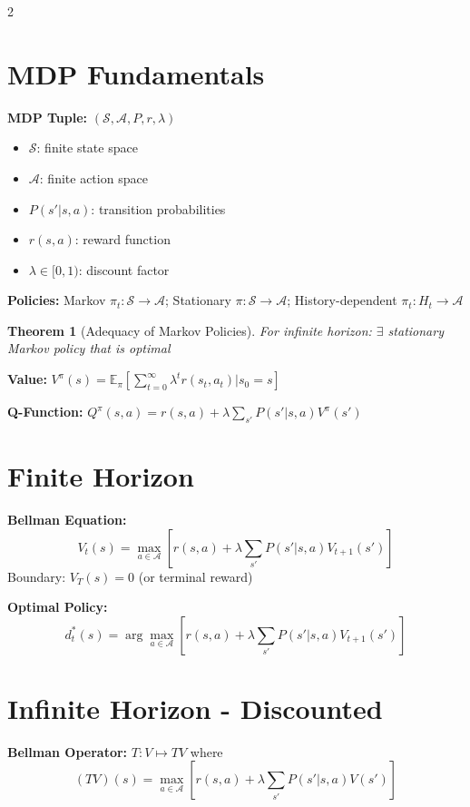 \documentclass[8pt]{extarticle}
\newtheorem{theorem}{Theorem}
\begin{document}
\tiny
\begin{multicols}{2}

\section*{\textcolor{theoremblue}{MDP Fundamentals}}
\textbf{MDP Tuple:} $(\mathcal{S}, \mathcal{A}, P, r, \lambda)$
\begin{itemize}[leftmargin=*]
    \item $\mathcal{S}$: finite state space
    \item $\mathcal{A}$: finite action space  
    \item $P(s'|s,a)$: transition probabilities
    \item $r(s,a)$: reward function
    \item $\lambda \in [0,1)$: discount factor
\end{itemize}

\textbf{Policies:} Markov $\pi_t: \mathcal{S} \to \mathcal{A}$; Stationary $\pi: \mathcal{S} \to \mathcal{A}$; History-dependent $\pi_t: H_t \to \mathcal{A}$

\begin{theorem}[Adequacy of Markov Policies]
For infinite horizon: $\exists$ stationary Markov policy that is optimal
\end{theorem}

\textbf{Value:} $V^\pi(s) = \mathbb{E}_\pi[\sum_{t=0}^\infty \lambda^t r(s_t, a_t) | s_0 = s]$

\textbf{Q-Function:} $Q^\pi(s,a) = r(s,a) + \lambda \sum_{s'} P(s'|s,a) V^\pi(s')$

\section*{\textcolor{theoremblue}{Finite Horizon}}
\textbf{Bellman Equation:}
$$V_t(s) = \max_{a \in \mathcal{A}} \left[r(s,a) + \lambda \sum_{s'} P(s'|s,a) V_{t+1}(s')\right]$$
Boundary: $V_T(s) = 0$ (or terminal reward)

\textbf{Optimal Policy:}
$$d_t^*(s) = \arg\max_{a \in \mathcal{A}} \left[r(s,a) + \lambda \sum_{s'} P(s'|s,a) V_{t+1}(s')\right]$$

\section*{\textcolor{theoremblue}{Infinite Horizon - Discounted}}
\textbf{Bellman Operator:} $T: V \mapsto TV$ where
$$(TV)(s) = \max_{a \in \mathcal{A}} \left[r(s,a) + \lambda \sum_{s'} P(s'|s,a) V(s')\right]$$


\end{multicols}
\end{document}
